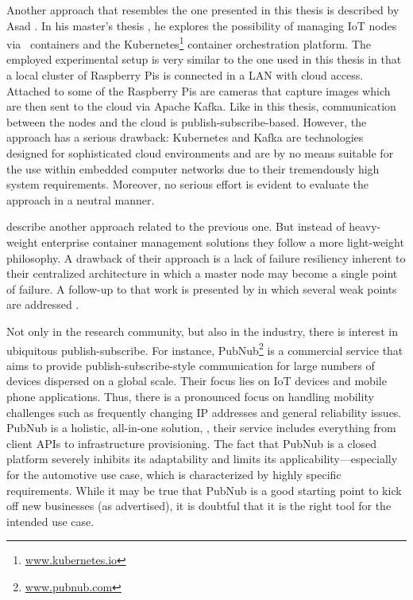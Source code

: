 Another approach that resembles the one presented in this thesis is described by Asad \citeauthor*{javed2016container}. In his master's thesis \cite{javed2016container}, he explores the possibility of managing IoT nodes via \docker\ containers and the Kubernetes\footnote{\url{www.kubernetes.io}} container orchestration platform. The employed experimental setup is very similar to the one used in this thesis in that a local cluster of Raspberry Pis is connected in a LAN with cloud access. Attached to some of the Raspberry Pis are cameras that capture images which are then sent to the cloud via Apache Kafka. Like in this thesis, communication between the nodes and the cloud is publish-subscribe-based. However, the approach has a serious drawback: Kubernetes and Kafka are technologies designed for sophisticated cloud environments and are by no means suitable for the use within embedded computer networks due to their tremendously high system requirements. Moreover, no serious effort is evident to evaluate the approach in a neutral manner.

\citeauthor*{grossmann2016hypriot} describe another approach \cite{grossmann2016hypriot} related to the previous one. But instead of heavy-weight enterprise container management solutions they follow a more light-weight philosophy. A drawback of their approach is a lack of failure resiliency inherent to their centralized architecture in which a master node may become a single point of failure. A follow-up to that work is presented by \citeauthor*{celesti2017watchdog} in which several weak points are addressed \cite{celesti2017watchdog}.

Not only in the research community, but also in the industry, there is interest in ubiquitous publish-subscribe. 
For instance, PubNub\footnote{\url{www.pubnub.com}} is a commercial service that aims to provide publish-subscribe-style communication for large numbers of devices dispersed on a global scale. Their focus lies on IoT devices and mobile phone applications. Thus, there is a pronounced focus on handling mobility challenges such as frequently changing IP addresses and general reliability issues. PubNub is a holistic, all-in-one solution, \ie , their service includes everything from client APIs to infrastructure provisioning. The fact that \mbox{PubNub} is a closed platform severely inhibits its adaptability and limits its applicability---especially for the automotive use case, which is characterized by highly specific requirements. While it may be true that PubNub is a good starting point to kick off new businesses (as advertised), it is doubtful that it is the right tool for the intended use case.

